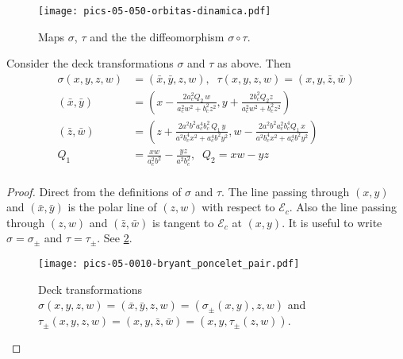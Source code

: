 \begin{figure}
	\begin{center}
		 \texttt{[image: pics-05-050-orbitas-dinamica.pdf]}
		\caption{Maps $\sigma$, $\tau$ and the the diffeomorphism $\sigma\circ\tau$.}
	\end{center}
\label{fig:caustic2}
\end{figure}


\begin{lemma}
Consider the deck transformations $\sigma$ and $\tau$ as above.
Then
\begin{align*}
   \sigma(x,y,z,w) &=(\bar x, \bar y,z,w),\;\; \tau(x,y,z,w)=(x,y,\bar z,\bar w)\\
   (\bar x,\bar y)&=\left( x - \frac{2 a_c^2        Q_2\, w}{a_c^2  w^2 + b_c^2  z^2}, y + \frac{2  b_c^2     Q_2 z}{a_c^2  w^2 + b_c^2  z^2}\right) \\
   (\bar z,\bar w)&=\left( z+\frac{2a^2 b^2 a_c^4 b_c^2  \,    Q_1\, y}{a^2 b_c^4 x^2 + a_c^4 b^2 y^2}, w-\frac{2 a^2 b^2 a_c^2 b_c^4     Q_1\, x}{a^2 b_c^4 x^2 + a_c^4 b^2 y^2} \right)\\
      Q_1 &=\frac{x w}{ a_c^2 b^2} - \frac{y z}{a^2 b_c^2}, \;\;    Q_2=x w-y z\\
\end{align*}
\end{lemma}

\begin{proof} Direct from the definitions of $\sigma$ and $\tau$. The line passing through $(x,y)$ and $(\bar x, \bar y)$ is the polar line of $(z,w)$ with respect to $\mathcal{E}_c$. Also the line passing through $(z,w) $ and $(\bar z,\bar w)$ is tangent to $\mathcal{E}_c$ at $(x,y)$. It is useful to write $\sigma=\sigma_{\pm}$ and $\tau=\tau_{\pm}$. See \cref{fig:05-pics-poncelet-bryant}.
\begin{figure}
    \centering
    \texttt{[image: pics-05-0010-bryant\_poncelet\_pair.pdf]}
    \caption{Deck transformations $\sigma (x,y,z,w)=(\bar x,\bar y,z,w)=(\sigma_{\pm}(x,y),z,w)$ and $\tau_{\pm}(x,y,z,w)=(x,y,\bar z,\bar w)= (x,y, \tau_{\pm}(z,w) )$. }
    \label{fig:05-pics-poncelet-bryant}
\end{figure}
\end{proof}

